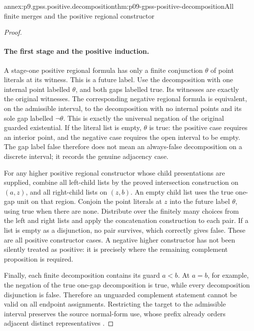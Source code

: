 \begin{annexitem}{annex:p9.gpss.positive.decomposition}{thm:p09-gpss-positive-decomposition}{All finite merges and the positive regional constructor}
\begin{proof}
\paragraph{The first stage and the positive induction.}
A stage-one positive regional formula
has only a finite conjunction \(\theta\)
of point literals at its witness. This
is a future label. Use the decomposition
with one internal point labelled
\(\theta\), and both gaps labelled
true. Its witnesses are exactly the
original witnesses. The corresponding
negative regional formula is equivalent,
on the admissible interval, to the
decomposition with no internal points
and its sole gap labelled
\(\neg\theta\). This is exactly
the universal negation of the original
guarded existential. If the literal
list is empty, \(\theta\) is true:
the positive case requires an interior
point, and the negative case requires
the open interval to be empty. The
gap label false therefore does not
mean an always-false decomposition
on a discrete interval; it records
the genuine adjacency case.

For any higher positive regional
constructor whose child presentations
are supplied, combine all left-child
lists by the proved intersection
construction on \((a,z)\), and
all right-child lists on \((z,b)\).
An empty child list uses the true
one-gap unit on that region. Conjoin
the point literals at \(z\) into
the future label \(\theta\), using
true when there are none. Distribute
over the finitely many choices from
the left and right lists and apply
the concatenation construction to
each pair. If a list is empty as
a disjunction, no pair survives,
which correctly gives false.
These are all positive constructor
cases. A negative higher constructor
has not been silently treated as
positive: it is precisely where
the remaining complement proposition
is required.

Finally, each finite decomposition
contains its guard \(a<b\).
At \(a=b\), for example, the
negation of the true one-gap
decomposition is true, while every
decomposition disjunction is false.
Therefore an unguarded complement
statement cannot be valid on all
endpoint assignments. Restricting
the target to the admissible
interval preserves the source
normal-form use, whose prefix
already orders adjacent distinct
representatives
\cite[pp.~170--171]{GabbayPnueliShelahStavi1980}.


\end{proof}
\end{annexitem}
